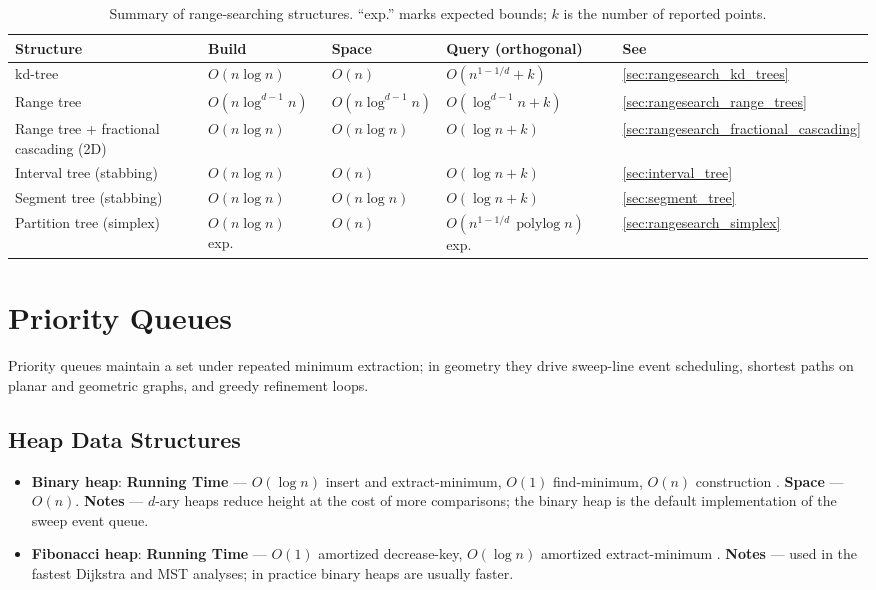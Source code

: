 \begin{table}[htbp]
\centering
\begin{tabular}{lllll}
\toprule
Structure & Build & Space & Query (orthogonal) & See \\
\midrule
kd-tree         & $O(n\log n)$ & $O(n)$ & $O(n^{1-1/d}+k)$ & \ref{sec:rangesearch_kd_trees} \\
Range tree      & $O(n\log^{d-1} n)$ & $O(n\log^{d-1} n)$ & $O(\log^{d-1} n+k)$ & \ref{sec:rangesearch_range_trees} \\
Range tree + fractional cascading (2D) & $O(n\log n)$ & $O(n\log n)$ & $O(\log n+k)$ & \ref{sec:rangesearch_fractional_cascading} \\
Interval tree (stabbing) & $O(n\log n)$ & $O(n)$ & $O(\log n+k)$ & \ref{sec:interval_tree} \\
Segment tree (stabbing)  & $O(n\log n)$ & $O(n\log n)$ & $O(\log n+k)$ & \ref{sec:segment_tree} \\
Partition tree (simplex) & $O(n\log n)$ exp.\ & $O(n)$ & $O(n^{1-1/d}\,\operatorname{polylog} n)$ exp.\ & \ref{sec:rangesearch_simplex} \\
\bottomrule
\end{tabular}
\caption{Summary of range-searching structures. ``exp.'' marks expected
bounds; $k$ is the number of reported points.}
\label{tbl:appalgs_range}
\end{table}

\section{Priority Queues}
\label{sec:app_alg_priority_queues}

Priority queues maintain a set under repeated minimum extraction; in
geometry they drive sweep-line event scheduling, shortest paths on planar
and geometric graphs, and greedy refinement loops.

\subsection{Heap Data Structures}
\label{sec:appalgs_pq_heaps}

\begin{itemize}
  \item \textbf{Binary heap}: \textbf{Running Time} ---
    $O(\log n)$ insert and extract-minimum, $O(1)$ find-minimum, $O(n)$
    construction \cite{cormen2009}. \textbf{Space} --- $O(n)$.
    \textbf{Notes} --- $d$-ary heaps reduce height at the cost of more
    comparisons; the binary heap is the default implementation of the
    sweep event queue.
  \item \textbf{Fibonacci heap}: \textbf{Running Time} ---
    $O(1)$ amortized decrease-key, $O(\log n)$ amortized extract-minimum
    \cite{cormen2009}. \textbf{Notes} --- used in the fastest Dijkstra and
    MST analyses; in practice binary heaps are usually faster.
\end{itemize}

